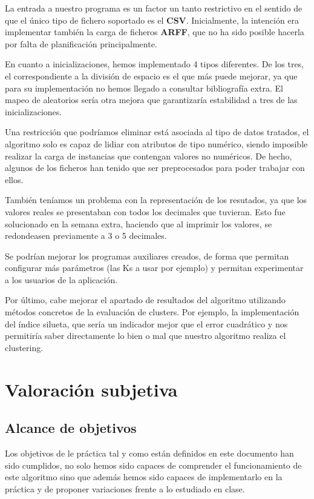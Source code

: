 \documentclass[a4paper]{report}
\begin{document}
La entrada a nuestro programa es un factor un tanto restrictivo en el sentido de que el único tipo de fichero soportado es el \textbf{CSV}. Inicialmente, la intención era implementar también la carga de ficheros \textbf{ARFF}, que no ha sido posible hacerla por falta de planificación principalmente.

En cuanto a inicializaciones, hemos implementado 4 tipos diferentes. De los tres, el correspondiente a la división de espacio es el que más puede mejorar, ya que para su implementación no hemos llegado a consultar bibliografía extra. El mapeo de aleatorios sería otra mejora que garantizaría estabilidad a tres de las inicializaciones.

Una restricción que podríamos eliminar está asociada al tipo de datos tratados, el algoritmo solo es capaz de lidiar con atributos de tipo numérico, siendo imposible realizar la carga de instancias que contengan valores no numéricos. De hecho, algunos de los ficheros han tenido que ser preprocesados para poder trabajar con ellos.

También teníamos un problema con la representación de los resutados, ya que los valores reales se presentaban con todos los decimales que tuvieran. Esto fue solucionado en la semana extra, haciendo que al imprimir los valores, se redondeasen previamente a 3 o 5 decimales.

Se podrían mejorar los programas auxiliares creados, de forma que permitan configurar más parámetros (las Ks a usar por ejemplo) y permitan experimentar a los usuarios de la aplicación.

Por último, cabe mejorar el apartado de resultados del algoritmo utilizando métodos concretos de la evaluación de clusters. Por ejemplo, la implementación del índice silueta, que sería un indicador mejor que el error cuadrático y nos permitiría saber directamente lo bien o mal que nuestro algoritmo realiza el clustering.




\newpage




\newpage


\chapter{Valoración subjetiva}
	
	\section*{Alcance de objetivos}
	Los objetivos de le práctica tal y como están definidos en este documento han sido cumplidos, no solo hemos sido capaces de comprender el funcionamiento de este algoritmo sino que además hemos sido capaces de implementarlo en la práctica y de proponer variaciones frente a lo estudiado en clase.
\end{document}

